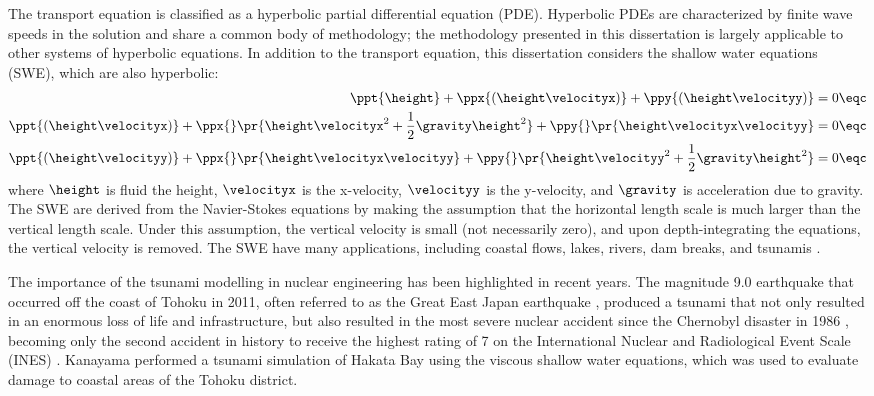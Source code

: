 The transport equation is classified as a hyperbolic partial differential
equation (PDE). Hyperbolic PDEs are characterized by finite wave speeds
in the solution and share a common body of methodology; the methodology
presented in this dissertation is largely applicable to other systems of
hyperbolic equations. In addition to the transport equation, this
dissertation considers the shallow water equations (SWE), which are
also hyperbolic:
\begin{subequations}
\begin{align}
  \ppt{\height} + \ppx{(\height\velocityx)} + \ppy{(\height\velocityy)} &= 0
  \eqc\\
  \ppt{(\height\velocityx)}
    + \ppx{}\pr{\height\velocityx^2 + \frac{1}{2}\gravity\height^2}
    + \ppy{}\pr{\height\velocityx\velocityy} &= 0
  \eqc\\
  \ppt{(\height\velocityy)}
    + \ppx{}\pr{\height\velocityx\velocityy}
    + \ppy{}\pr{\height\velocityy^2 + \frac{1}{2}\gravity\height^2} &= 0
  \eqc
\end{align}
\end{subequations}
where $\height$ is fluid the height, $\velocityx$ is the x-velocity,
$\velocityy$ is the y-velocity, and $\gravity$ is acceleration due to
gravity.
The SWE are derived from the Navier-Stokes
equations by making the assumption that the horizontal length
scale is much larger than the vertical length scale. Under this
assumption, the vertical velocity is small (not necessarily zero),
and upon depth-integrating the equations, the vertical velocity
is removed. The SWE have many applications, including coastal
flows, lakes, rivers, dam breaks, and tsunamis \cite{kirby}.


The importance of the tsunami modelling in nuclear engineering has
been highlighted in recent years.
The magnitude 9.0 earthquake that occurred off the coast of Tohoku in 2011,
often referred to as the Great East Japan earthquake \cite{USGS_tohoku},
produced a tsunami that not only
resulted in an enormous loss of life and infrastructure, but
also resulted in the most severe nuclear accident since the Chernobyl
disaster in 1986 \cite{IAEAfukushima}, becoming only the second
accident in history to receive the highest rating of 7 on the International
Nuclear and Radiological Event Scale (INES) \cite{IAEA_fukushima_scale}.
Kanayama \cite{Kanayama2013} performed a tsunami simulation of
Hakata Bay using the viscous shallow water equations, which was
used to evaluate damage to coastal areas of the Tohoku district.
